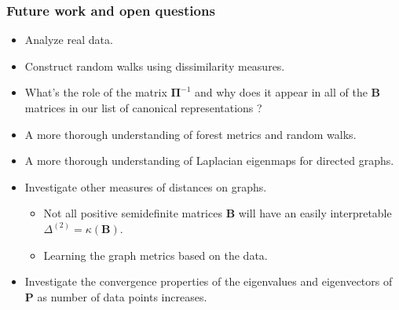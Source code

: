 \documentclass[professionalfonts, hyperref={pdfpagelabels=false,
  colorlinks=true, linkcolor=purple}]{beamer}
\begin{document}
\begin{frame}
  \frametitle{Future work and open questions}
  \begin{itemize}
  \item Analyze \alert{real} data.
  \item Construct random walks using dissimilarity measures.
  \item What's the role of the matrix $\bm{\Pi}^{-1}$ and why does it
    appear in all of the $\bm{B}$ matrices in our list of canonical
    representations ? 
  \item A more thorough understanding of forest metrics and random walks.
  \item A more thorough understanding of Laplacian eigenmaps for
    directed graphs.
  \item Investigate other measures of distances on graphs.
    \begin{itemize}
      \item Not all positive semidefinite matrices $\bm{B}$ will have
        an easily interpretable $\Delta^{(2)} = \kappa(\bm{B})$.
      \item Learning the graph metrics based on the data.   
    \end{itemize}
  \item Investigate the convergence properties of the eigenvalues and
    eigenvectors of $\bm{P}$ as number of data points increases.
  \end{itemize}
\end{frame}
\end{document}
